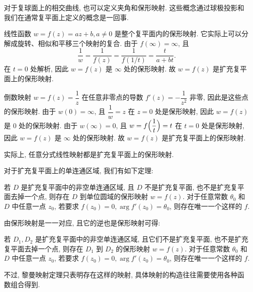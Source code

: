 对于复球面上的相交曲线, 也可以定义夹角和保形映射.
这些概念通过球极投影和我们在通常复平面上定义的概念是一回事.

\begin{example}
  \label{exam:linear-transform}
  线性函数 $w=f(z)=az+b,a\neq 0$ 是整个复平面内的保形映射.
  它实际上可以分解成旋转、相似和平移三个映射的复合.
  由于 $f(\infty)=\infty$, 且
  \[
    \dfrac1w=\dfrac1{f(z)}=\dfrac1{f(1/t)}=\dfrac{t}{a+bt}.
  \]
  在 $t=0$ 处解析, 因此 $w=f(z)$ 是 $\infty$ 处的保形映射.
  故 $w=f(z)$ 是扩充复平面上的保形映射.
\end{example}

\begin{example}
  \label{exam:inverse-transform}
  倒数映射 $w=f(z)=\dfrac1z$ 在任意非零点的导数 $f'(z)=-\dfrac1{z^2}$ 非零, 因此是这些点的保形映射.
  由于 $w(0)=\infty$, 且 $\dfrac1w=z$ 在 $z=0$ 处是保形映射, 因此 $w=f(z)$ 是 $0$ 处的保形映射.
  由于 $w(\infty)=0$, 且 $w=f\Bigl(\dfrac1t\Bigr)=t$ 在 $t=0$ 处是保形映射, 因此 $w=f(z)$ 是 $\infty$ 处的保形映射.
  故 $w=f(z)$ 是扩充复平面上的保形映射.
\end{example}

实际上, 任意分式线性映射都是扩充复平面上的保形映射.

对于扩充复平面上的单连通区域, 我们有如下定理:

\begin{theorem}[黎曼映射定理]
  \label{thm:riemann-mapping}
  若 $D$ 是扩充复平面中的非空单连通区域, 且 $D$ 不是扩充复平面, 也不是扩充复平面去掉一个点, 则存在 $D$ 到单位圆域的保形映射 $w=f(z)$.\footnotemark
  对于任意常数 $\theta_0$ 和 $D$ 中任意一点 $z_0$, 若要求 $f(z_0)=0,\arg f'(z_0)=\theta_0$, 则存在唯一一个这样的 $f$.
\end{theorem}

由保形映射是一一对应, 且它的逆也是保形映射可得:
\begin{corollary}
  若 $D_1,D_2$ 是扩充复平面中的非空单连通区域, 且它们不是扩充复平面, 也不是扩充复平面去掉一个点, 则存在 $D_1$ 到 $D_2$ 的保形映射 $w=f(z)$.
  对于任意常数 $\theta_0$ 和 $D$ 中任意一点 $z_0$, 若要求 $f(z_0)=0,\arg f'(z_0)=\theta_0$, 则存在唯一一个这样的 $f$.
\end{corollary}

不过, 黎曼映射定理只表明存在这样的映射, 具体映射的构造往往需要使用各种函数组合得到.



